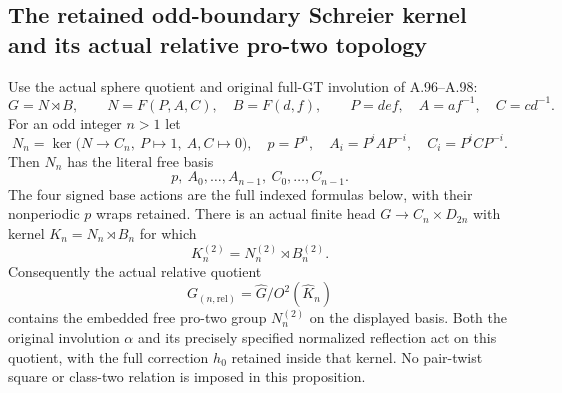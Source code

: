 \subsection*{The retained odd-boundary Schreier kernel and its actual relative pro-two topology}
\label{stmt:A102}
Use the actual sphere quotient and original full-GT involution of
A.96--A.98:
\[
 G=N\rtimes B,\qquad N=F(P,A,C),\quad B=F(d,f),\qquad
 P=def,\quad A=af^{-1},\quad C=cd^{-1}.
\]
For an odd integer $n>1$ let
\[
 N_n=\ker\bigl(N\to C_n,\ P\mapsto1,\ A,C\mapsto0\bigr),
 \quad p=P^n,\quad A_i=P^iAP^{-i},\quad C_i=P^iCP^{-i}.
\]
Then $N_n$ has the literal free basis
\[
 p,\ A_0,\ldots,A_{n-1},\ C_0,\ldots,C_{n-1}.
\]
The four signed base actions are the full indexed formulas below, with
their nonperiodic $p$ wraps retained. There is an actual finite head
$G\to C_n\times D_{2n}$ with kernel $K_n=N_n\rtimes B_n$ for which
\[
 K_n^{(2)}=N_n^{(2)}\rtimes B_n^{(2)}.
\]
Consequently the actual relative quotient
\[
 G_{(n,\mathrm{rel})}
 =\widehat G/O^2(\widehat K_n)
\]
contains the embedded free pro-two group $N_n^{(2)}$ on the displayed
basis. Both the original involution $\alpha$ and its precisely
specified normalized reflection act on this quotient, with the full
correction $h_0$ retained inside that kernel. No pair-twist square or
class-two relation is imposed in this proposition.
